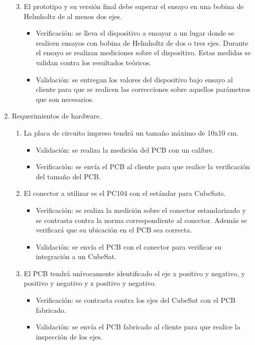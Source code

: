 \documentclass[
11pt, %
]{charter}
\begin{document}
\begin{enumerate}
\begin{enumerate}
		\setcounter{enumii}{2}
		\item  El prototipo y su versión final debe superar el ensayo en una bobina de Helmholtz de al menos dos ejes.  
			\begin{itemize}
				\item Verificación: se lleva el dispositivo a ensayar a un lugar donde se realicen ensayos con bobina de Helmholtz de dos o tres ejes. Durante el ensayo se realizan mediciones sobre el dispositivo. Estas medidas se validan contra los resultados teóricos. 
				\item Validación: se entregan los valores del dispositivo bajo ensayo al cliente para que se realicen las correcciones sobre aquellos parámetros que son necesarios. 
			\end{itemize}
	\end{enumerate}
	\item Requerimientos de hardware.
	\begin{enumerate}
		\item La placa de circuito impreso tendrá un tamaño máximo de 10x10 cm.
			\begin{itemize}
				\item Validación: se realiza la medición del PCB con un calibre. 
				\item Verificación: se envía el PCB al cliente para que realice la verificación del tamaño del PCB.
			\end{itemize}
		\item El conector a utilizar es el PC104 con el estándar para CubeSats. 
			\begin{itemize}
				\item Verificación: se realiza la medición sobre el conector estandarizado y se contrasta contra la norma correspondiente al conector. Además se verificará que su ubicación en el PCB sea correcta. 
				\item Validación: se envía el PCB con el conector para verificar su integración a un CubeSat.  
			\end{itemize}
		\item El PCB tendrá unívocamente identificado el eje x positivo y negativo, y positivo y negativo y z positivo y negativo. 
			\begin{itemize}
				\item Verificación: se contrasta contra los ejes del CubeSat con el PCB fabricado.   
				\item Validación: se envía el PCB fabricado al cliente para que realice la inspección de los ejes.  
			\end{itemize}



	\end{enumerate}
	
\end{enumerate}
\end{document}
